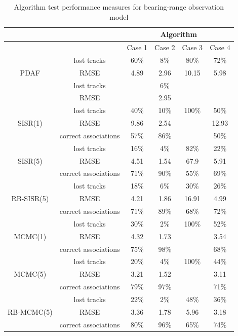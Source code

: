 \begin{table} \centering
\begin{tabular}{|c|c|c|c|c|c|}
\hline
 & & \multicolumn{4}{|c|}{Algorithm} \\
\hline
 & & Case 1 & Case 2 & Case 3 & Case 4 \\
\hline
\multirow{3}{*}{PDAF} & lost tracks             & 60\% & 8\% & 80\% & 72\% \\
                         & RMSE                 & 4.89 & 2.96 & 10.15 & 5.98 \\
\hline
\multirow{3}{*}{JPDAF} & lost tracks            &  & 6\% &  &  \\
                         & RMSE                 &  & 2.95 &  &  \\
\hline
\multirow{3}{*}{SISR(1)} & lost tracks          & 40\% & 10\% & 100\% & 50\% \\
                         & RMSE                 & 9.86 & 2.54 &  & 12.93 \\
                         & correct associations & 57\% & 86\% &  & 50\% \\
\hline
\multirow{3}{*}{SISR(5)} & lost tracks          & 16\% & 4\% & 82\% & 22\% \\
                         & RMSE                 & 4.51 & 1.54 & 67.9 & 5.91 \\
                         & correct associations & 71\% & 90\% & 55\% & 69\% \\
\hline
\multirow{3}{*}{RB-SISR(5)} & lost tracks       & 18\% & 6\% & 30\% & 26\% \\
                         & RMSE                 & 4.21 & 1.86 & 16.91 & 4.99 \\
                         & correct associations & 71\% & 89\% & 68\% & 72\% \\
\hline
\multirow{3}{*}{MCMC(1)} & lost tracks          & 30\% & 2\% & 100\% & 52\% \\
                         & RMSE                 & 4.32 & 1.73 &  & 3.54 \\
                         & correct associations & 75\% & 98\% &  & 68\% \\
\hline
\multirow{3}{*}{MCMC(5)} & lost tracks          & 20\% & 4\% & 100\% & 44\% \\
                         & RMSE                 & 3.21 & 1.52 &  & 3.11 \\
                         & correct associations & 79\% & 97\% &  & 71\% \\
\hline
\multirow{3}{*}{RB-MCMC(5)} & lost tracks       & 22\% & 2\% & 48\% & 36\% \\
                         & RMSE                 & 3.36 & 1.78 & 5.96 & 3.18 \\
                         & correct associations & 80\% & 96\% & 65\% & 74\% \\
\hline
\end{tabular}
\caption{Algorithm test performance measures for bearing-range observation model}
\label{tab:ResultsRadar}
\end{table}

